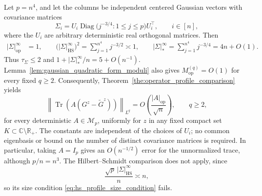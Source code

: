 \documentclass[EJP, preprint, NODS, nobera, nofontexpansion]{ejpecp}
\DeclareMathOperator{\op}{op}
\DeclareMathOperator{\tr}{Tr}
\DeclareMathOperator{\diag}{Diag}
\DeclareMathOperator{\hs}{HS}
\begin{document}
\begin{example}
\label{exa:bounded_hs_profiles}
Let $p=n^4$, and let the columns be independent centered Gaussian vectors
with covariance matrices
\[
    \Sigma_i
    =U_i\diag\bigl(j^{-3/4}:1\leq j\leq p\bigr)U_i^\top,
    \qquad i\in[n],
\]
where the $U_i$ are arbitrary deterministic real orthogonal matrices.
Then
\begin{align*}
    |\Sigma|_{\op}^\infty&=1,
    \qquad
    \bigl(|\Sigma|_{\hs}^\infty\bigr)^2
    =\sum_{j=1}^{n^4}j^{-3/2}\asymp1,\qquad
    |\Sigma|_*^\infty
    =\sum_{j=1}^{n^4}j^{-3/4}
      =4n+O(1).
\end{align*}
Thus $\tau_\Sigma\leq2$ and
$1+|\Sigma|_*^\infty/n=5+O(n^{-1})$.
Lemma~\ref{lem:gaussian_quadratic_form_moduli} also gives
$M_{\op}^{(q)}=O(1)$ for every fixed $q\geq2$.
Consequently, Theorem~\ref{the:operator_profile_comparison} yields
\begin{equation}
\label{eq:square_summable_profile_operator_rate}
    \left\|\tr\!\left(A(G^z-\tilde G^z)\right)\right\|_{L^q}
    =O\!\left(\frac{|A|_{\op}}{\sqrt n}\right),
    \qquad q\geq2,
\end{equation}
for every deterministic $A\in\mathcal M_p$, uniformly for $z$ in any
fixed compact set $K\subset\mathbb C\setminus\mathbb R_+$. The constants are independent of
the choices of $U_i$; no common eigenbasis or bound on the number of
distinct covariance matrices is required. In particular, taking $A=I_p$
gives an $O(n^{-1/2})$ error for the unnormalized trace, although $p/n=n^3$.
The Hilbert--Schmidt comparison does not apply, since
\[
    \frac{\sqrt p\,|\Sigma|_{\hs}^\infty}{n}\asymp n,
\]
so its size condition \eqref{eq:hs_profile_size_condition} fails.


\end{example}
\end{document}
